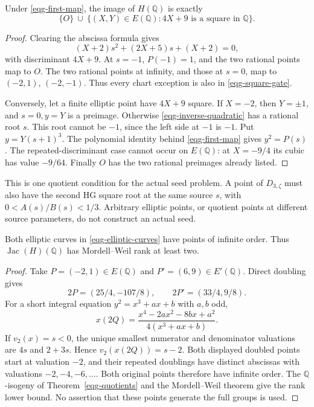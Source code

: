 \begin{theorem}
\label{eqg-image}
Under \eqref{eqg-first-map}, the image of \(H(\mathbb Q)\) is exactly
\begin{equation}\label{eqg-square-gate}
 \{O\}\ \cup\
 \{(X,Y)\in E(\mathbb Q):4X+9\text{ is a square in }\mathbb Q\}.
\end{equation}
\end{theorem}
\begin{proof}
Clearing the abscissa formula gives
\begin{equation}\label{eqg-inverse-quadratic}
 (X+2)s^2+(2X+5)s+(X+2)=0,
\end{equation}
with discriminant \(4X+9\). At \(s=-1\), \(P(-1)=1\),
and the two rational points map to \(O\). The two rational
points at infinity, and those at \(s=0\), map to
\((-2,1)\), \((-2,-1)\). Thus every chart exception is
also in \eqref{eqg-square-gate}.

Conversely, let a finite elliptic point have \(4X+9\) square.
If \(X=-2\), then \(Y=\pm1\), and \(s=0,y=Y\) is a preimage.
Otherwise \eqref{eqg-inverse-quadratic} has a rational root \(s\).
This root cannot be \(-1\), since the left side at \(-1\)
is \(-1\). Put \(y=Y(s+1)^3\). The polynomial identity
behind \eqref{eqg-first-map} gives \(y^2=P(s)\).
The repeated-discriminant case cannot occur on \(E(\mathbb Q)\):
at \(X=-9/4\) its cubic has value \(-9/64\).
Finally \(O\) has the two rational preimages already listed.
\end{proof}

This is one quotient condition for the actual seed problem.
A point of \(D_{3,\zeta}\) must also have the second HG square
root at the same source \(s\), with \(0<A(s)/B(s)<1/3\).
Arbitrary elliptic points, or quotient points at different
source parameters, do not construct an actual seed.

\begin{theorem}\label{eqg-rank-lower}
Both elliptic curves in \eqref{eqg-elliptic-curves} have points
of infinite order. Thus \(\operatorname{Jac}(H)(\mathbb Q)\)
has Mordell--Weil rank at least two.
\end{theorem}
\begin{proof}
Take \(P=(-2,1)\in E(\mathbb Q)\) and \(P'=(6,9)\in E'(\mathbb Q)\).
Direct doubling gives
\[
 2P=(25/4,-107/8),\qquad 2P'=(33/4,9/8).
\]
For a short integral equation \(y^2=x^3+ax+b\) with \(a,b\) odd,
\[
 x(2Q)=\frac{x^4-2ax^2-8bx+a^2}{4(x^3+ax+b)}.
\]
If \(v_2(x)=s<0\), the unique smallest numerator and denominator
valuations are \(4s\) and \(2+3s\). Hence
\(v_2(x(2Q))=s-2\). Both displayed doubled points start at
valuation \(-2\), and their repeated doublings have distinct
abscissas with valuations \(-2,-4,-6,\ldots\).
Both original points therefore have infinite order.
The \(\mathbb Q\)-isogeny of Theorem~\ref{eqg-quotients} and
the Mordell--Weil theorem give the rank lower bound.
No assertion that these points generate the full groups is used.
\end{proof}

